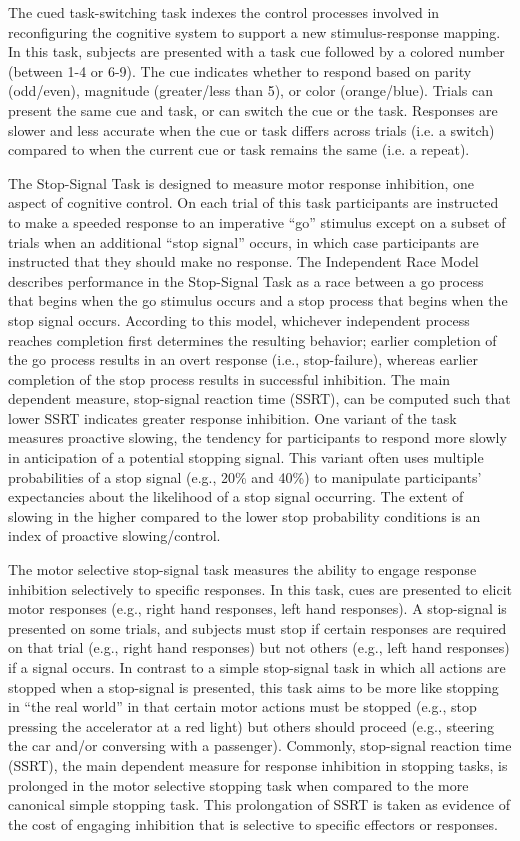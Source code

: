 \documentclass[titlepage,12pt] {article}
\begin{document}
The cued task-switching task indexes the control processes involved in reconfiguring the cognitive system to support a new stimulus-response mapping. In this task, subjects are presented with a task cue followed by a colored number (between 1-4 or 6-9). The cue indicates whether to respond based on parity (odd/even), magnitude (greater/less than 5), or color (orange/blue). Trials can present the same cue and task, or can switch the cue or the task. Responses are slower and less accurate when the cue or task differs across trials (i.e. a switch) compared to when the current cue or task remains the same (i.e. a repeat).

The Stop-Signal Task is designed to measure motor response inhibition, one aspect of cognitive control. On each trial of this task participants are instructed to make a speeded response to an imperative ``go'' stimulus except on a subset of trials when an additional ``stop signal'' occurs, in which case participants are instructed that they should make no response. The Independent Race Model describes performance in the Stop-Signal Task as a race between a go process that begins when the go stimulus occurs and a stop process that begins when the stop signal occurs. According to this model, whichever independent process reaches completion first determines the resulting behavior; earlier completion of the go process results in an overt response (i.e., stop-failure), whereas earlier completion of the stop process results in successful inhibition. The main dependent measure, stop-signal reaction time (SSRT), can be computed such that lower SSRT indicates greater response inhibition. One variant of the task measures proactive slowing, the tendency for participants to respond more slowly in anticipation of a potential stopping signal. This variant often uses multiple probabilities of a stop signal (e.g., 20\% and 40\%) to manipulate participants’ expectancies about the likelihood of a stop signal occurring. The extent of slowing in the higher compared to the lower stop probability conditions is an index of proactive slowing/control.

The motor selective stop-signal task measures the ability to engage response inhibition selectively to specific responses. In this task, cues are presented to elicit motor responses (e.g., right hand responses, left hand responses). A stop-signal is presented on some trials, and subjects must stop if certain responses are required on that trial (e.g., right hand responses) but not others (e.g., left hand responses) if a signal occurs. In contrast to a simple stop-signal task in which all actions are stopped when a stop-signal is presented, this task aims to be more like stopping in ``the real world'' in that certain motor actions must be stopped (e.g., stop pressing the accelerator at a red light) but others should proceed (e.g., steering the car and/or conversing with a passenger). Commonly, stop-signal reaction time (SSRT), the main dependent measure for response inhibition in stopping tasks, is prolonged in the motor selective stopping task when compared to the more canonical simple stopping task. This prolongation of SSRT is taken as evidence of the cost of engaging inhibition that is selective to specific effectors or responses.
\end{document}
